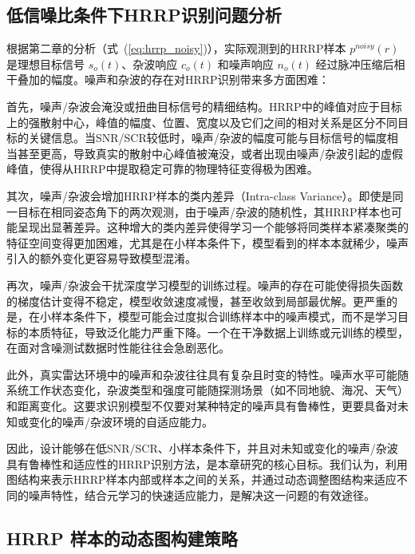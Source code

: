 \subsection{低信噪比条件下HRRP识别问题分析}
\label{subsec:noise_challenge_analysis}

根据第二章的分析（式~(\ref{eq:hrrp_noisy})），实际观测到的HRRP样本 $p^{noisy}(r)$ 是理想目标信号 $s_o(t)$、杂波响应 $c_o(t)$ 和噪声响应 $n_o(t)$ 经过脉冲压缩后相干叠加的幅度。噪声和杂波的存在对HRRP识别带来多方面困难：

首先，噪声/杂波会淹没或扭曲目标信号的精细结构。HRRP中的峰值对应于目标上的强散射中心，峰值的幅度、位置、宽度以及它们之间的相对关系是区分不同目标的关键信息。当SNR/SCR较低时，噪声/杂波的幅度可能与目标信号的幅度相当甚至更高，导致真实的散射中心峰值被淹没，或者出现由噪声/杂波引起的虚假峰值，使得从HRRP中提取稳定可靠的物理特征变得极为困难。

其次，噪声/杂波会增加HRRP样本的类内差异（Intra-class Variance）。即使是同一目标在相同姿态角下的两次观测，由于噪声/杂波的随机性，其HRRP样本也可能呈现出显著差异。这种增大的类内差异使得学习一个能够将同类样本紧凑聚类的特征空间变得更加困难，尤其是在小样本条件下，模型看到的样本本就稀少，噪声引入的额外变化更容易导致模型混淆。

再次，噪声/杂波会干扰深度学习模型的训练过程。噪声的存在可能使得损失函数的梯度估计变得不稳定，模型收敛速度减慢，甚至收敛到局部最优解。更严重的是，在小样本条件下，模型可能会过度拟合训练样本中的噪声模式，而不是学习目标的本质特征，导致泛化能力严重下降。一个在干净数据上训练或元训练的模型，在面对含噪测试数据时性能往往会急剧恶化。

此外，真实雷达环境中的噪声和杂波往往具有复杂且时变的特性。噪声水平可能随系统工作状态变化，杂波类型和强度可能随探测场景（如不同地貌、海况、天气）和距离变化。这要求识别模型不仅要对某种特定的噪声具有鲁棒性，更要具备对未知或变化的噪声/杂波环境的自适应能力。

因此，设计能够在低SNR/SCR、小样本条件下，并且对未知或变化的噪声/杂波具有鲁棒性和适应性的HRRP识别方法，是本章研究的核心目标。我们认为，利用图结构来表示HRRP样本内部或样本之间的关系，并通过动态调整图结构来适应不同的噪声特性，结合元学习的快速适应能力，是解决这一问题的有效途径。

\subsection{HRRP 样本的动态图构建策略}
\label{subsec:dynamic_graph_construction}

